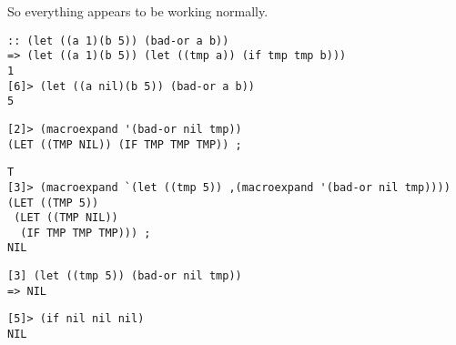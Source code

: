 \documentclass{article}
\begin{document}
So everything appears to be working normally.

\begin{verbatim}
:: (let ((a 1)(b 5)) (bad-or a b))
=> (let ((a 1)(b 5)) (let ((tmp a)) (if tmp tmp b)))
1
[6]> (let ((a nil)(b 5)) (bad-or a b))
5
\end{verbatim}


\begin{verbatim}
[2]> (macroexpand '(bad-or nil tmp))
(LET ((TMP NIL)) (IF TMP TMP TMP)) ;
\end{verbatim}

\begin{verbatim}
T
[3]> (macroexpand `(let ((tmp 5)) ,(macroexpand '(bad-or nil tmp))))
(LET ((TMP 5)) 
 (LET ((TMP NIL)) 
  (IF TMP TMP TMP))) ;
NIL
\end{verbatim}

\begin{verbatim}
[3] (let ((tmp 5)) (bad-or nil tmp))
=> NIL
\end{verbatim}

\begin{verbatim}
[5]> (if nil nil nil)
NIL
\end{verbatim}

\newpage
\end{document}
